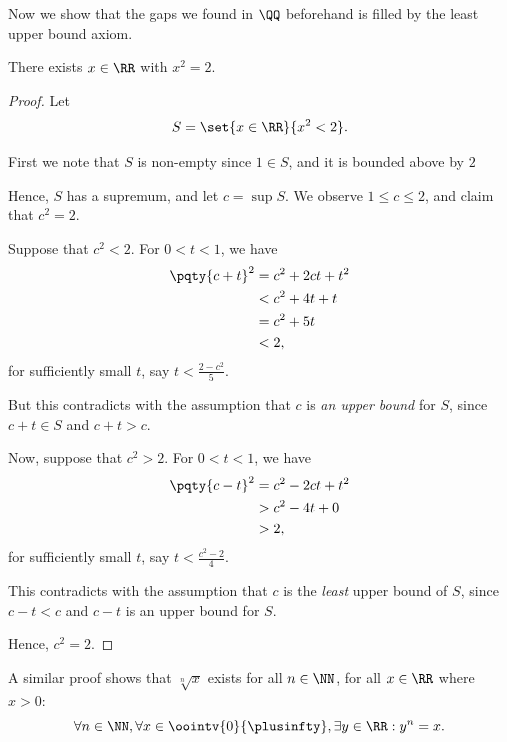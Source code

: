 Now we show that the gaps we found in \(\QQ\) beforehand is filled by the least upper bound axiom.

\begin{theorem}
    There exists \(x \in \RR\) with \(x^2 = 2\).
\end{theorem}

\begin{proof}
    Let
    \[
        S = \set{x \in \RR}{x^2 < 2}.
    \]

    First we note that \(S\) is non-empty since \(1 \in S\), and it is bounded above by \(2\)

    Hence, \(S\) has a supremum, and let \(c = \sup S\). We observe \(1 \leq c \leq 2\), and claim that \(c^2 = 2\).

    Suppose that \(c^2 < 2\). For \(0 < t < 1\), we have
    \begin{align*}
        \pqty{c + t}^2 &= c^2 + 2ct + t^2 \\
        &< c^2 + 4t + t \\
        &= c^2 + 5t \\
        &< 2,
    \end{align*}
    for sufficiently small \(t\), say \(t < \frac{2 - c^2}{5}\).

    But this contradicts with the assumption that \(c\) is \emph{an upper bound} for \(S\), since \(c + t \in S\) and \(c + t > c\).

    Now, suppose that \(c^2 > 2\). For \(0 < t < 1\), we have
    \begin{align*}
        \pqty{c - t}^2 &= c^2 - 2ct + t^2 \\
        &> c^2 - 4t + 0 \\
        &> 2,
    \end{align*}
    for sufficiently small \(t\), say \(t < \frac{c^2 - 2}{4}\).

    This contradicts with the assumption that \(c\) is the \emph{least} upper bound of \(S\), since \(c - t < c\) and \(c - t\) is an upper bound for \(S\).

    Hence, \(c^2 = 2\).
\end{proof}

\begin{remark}
    A similar proof shows that \(\sqrt[n]{x}\) exists for all \(n \in \NN\), for all \(x \in \RR\) where \(x > 0\):
    \[
        \forall n \in \NN, \forall x \in \oointv{0}{\plusinfty}, \exists y \in \RR: y^n = x.
    \]
\end{remark}

